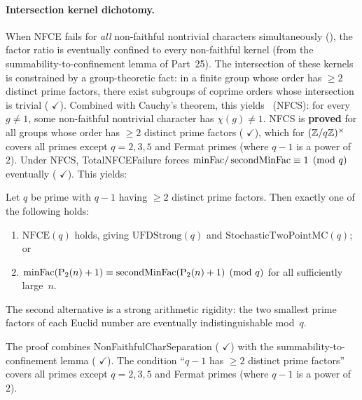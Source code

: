 \paragraph{Intersection kernel dichotomy.}
When NFCE fails for \emph{all} non-faithful nontrivial characters
simultaneously (), the factor ratio is
eventually confined to every non-faithful kernel (from the
summability-to-confinement lemma of Part~25).
The intersection of these kernels is constrained by a group-theoretic
fact: in a finite group whose order has $\geq 2$ distinct prime
factors, there exist subgroups of coprime orders whose intersection is
trivial
(
{\color{leanink}$\checkmark$}).  Combined with Cauchy's theorem, this
yields ~(NFCS): for every
$g \neq 1$, some non-faithful nontrivial character has $\chi(g) \neq 1$.
NFCS is
\textbf{proved} for all groups whose order has $\geq 2$ distinct prime
factors
(
{\color{leanink}$\checkmark$}), which for $(\mathbb{Z}/q\mathbb{Z})^\times$ covers
all primes except $q = 2, 3, 5$ and Fermat primes (where $q - 1$ is a
power of~$2$).
Under NFCS, TotalNFCEFailure forces
$\mathrm{minFac} / \operatorname{secondMinFac} \equiv 1 \pmod{q}$ eventually
(
{\color{leanink}$\checkmark$}).
This yields:

\begin{theorem}
\label{thm:kernel-dichotomy}
Let $q$ be prime with $q - 1$ having $\geq 2$ distinct prime factors.
Then exactly one of the following holds:
\begin{enumerate}[nosep]
\item $\mathrm{NFCE}(q)$ holds, giving
  $\mathrm{UFDStrong}(q)$ and $\mathrm{StochasticTwoPointMC}(q)$; or
\item $\mathrm{minFac}(\mathrm{P}_{2}(n)+1) \equiv \operatorname{secondMinFac}(\mathrm{P}_{2}(n)+1) \pmod{q}$
  for all sufficiently large~$n$.
\end{enumerate}
The second alternative is a strong arithmetic rigidity: the two
smallest prime factors of each Euclid number are eventually
indistinguishable mod~$q$.
\end{theorem}

\noindent
The proof combines NonFaithfulCharSeparation
(
{\color{leanink}$\checkmark$})
with the summability-to-confinement lemma
(
{\color{leanink}$\checkmark$}).
The condition ``$q{-}1$ has $\geq 2$ distinct prime factors'' covers
all primes except $q = 2, 3, 5$ and Fermat primes (where $q{-}1$ is a
power of~$2$).

